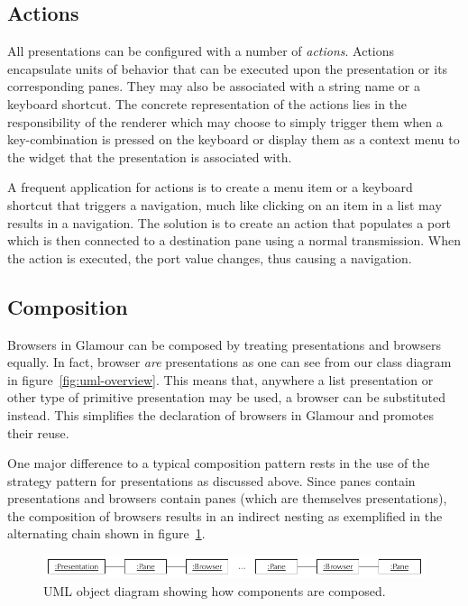 \documentclass[a4paper,10pt,twoside]{book}
\begin{document}
\subsection{Actions}
\label{sec:impl/actions}

All presentations can be configured with a number of \emph{actions}. Actions encapsulate units of behavior that can be executed upon the presentation or its corresponding panes. They may also be associated with a string name or a keyboard shortcut. The concrete representation of the actions lies in the responsibility of the renderer which may choose to simply trigger them when a key-combination is pressed on the keyboard or display them as a context menu to the widget that the presentation is associated with.

A frequent application for actions is to create a menu item or a keyboard shortcut that triggers a navigation, much like clicking on an item in a list may results in a navigation. The solution is to create an action that populates a port which is then connected to a destination pane using a normal transmission. When the action is executed, the port value changes, thus causing a navigation.


\subsection{Composition}
\label{sec:impl/composition}

Browsers in Glamour can be composed by treating presentations and browsers equally. In fact, browser \emph{are} presentations as one can see from our class diagram in figure~\ref{fig:uml-overview}. This means that, anywhere a list presentation or other type of primitive presentation may be used, a browser can be substituted instead. This simplifies the declaration of browsers in Glamour and promotes their reuse.

One major difference to a typical composition pattern rests in the use of the strategy pattern for presentations as discussed above. Since panes contain presentations and browsers contain panes (which are themselves presentations), the composition of browsers results in an indirect nesting as exemplified in the alternating chain shown in figure~\ref{fig:uml-object-chain}.

\begin{figure}[htbp]
\centerline{\includegraphics[width=\linewidth]{uml_object_chain.pdf}}
\caption{UML object diagram showing how components are composed.}
\label{fig:uml-object-chain}
\end{figure}
\end{document}
